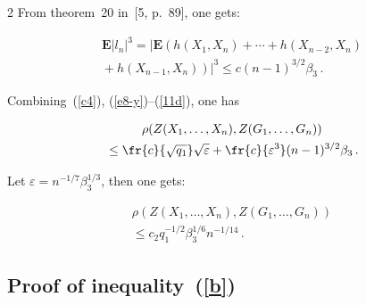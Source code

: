\begin{multicols}{2}
    From theorem~20 in~[5, p.~89], one gets:

    

    \noindent

     \begin{multline}

     \label{11d}

     \mathbf{E}|l_{n}|^{3}=\left\vert\mathbf{E}\left(h(X_1,X_n)+

     \cdots+h(X_{n-2},X_n)\right.\right.\\

\left.\left.     {}+h(X_{n-1},X_n)\right)\right\vert^{3}

    \leq c(n-1)^{3/2}\beta_3\,.

    \end{multline}

    



   Combining~(\ref{c4}), (\ref{e8-y})--(\ref{11d}), one has

   

   \noindent

   \begin{multline*}

   \rho(Z(X_1,\ldots,X_n),Z(G_1,\ldots,G_n))\\

   {}\leq 

   \fr{c}{\sqrt{q_1}}\sqrt{\varepsilon}+\fr{c}{\varepsilon^{3}}(n-1)^{3/2}\beta_3\,.

   \end{multline*}

   

   \pagebreak





\noindent

   Let $\varepsilon= n^{-1/7}\beta_3^{1/3}$, then one gets:

  \begin{multline*}

   \rho(Z(X_1,\ldots,X_n),Z(G_1,\ldots,G_n))\\

   {}\leq

   c_2q_1^{-1/2}\beta_3^{1/6}n^{-1/14}\,.

   \end{multline*}

   

    \subsection{Proof of inequality~(\ref{b})}




\end{multicols}
